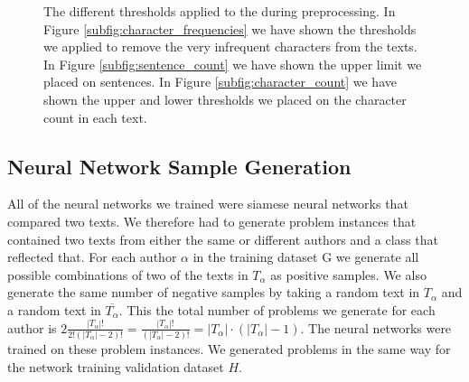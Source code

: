 \begin{figure}[htb]
\begin{minipage}{.5\linewidth}
{        }
    \end{minipage}\par\medskip
    \centering

    \caption{The different thresholds applied to the during preprocessing. In
        Figure \ref{subfig:character_frequencies} we have shown the thresholds
        we applied to remove the very infrequent characters from the texts. In
        Figure \ref{subfig:sentence_count} we have shown the upper limit we
        placed on sentences. In Figure \ref{subfig:character_count} we have
        shown the upper and lower thresholds we placed on the character count in
        each text.
    }
    \label{fig:cutoff_thresholds}
\end{figure}


\subsection{Neural Network Sample Generation} \label{subsec:problem_generation}

All of the neural networks we trained were siamese neural networks that
compared two texts. We therefore had to generate problem instances that
contained two texts from either the same or different authors and a class
that reflected that. For each author $\alpha$ in the training dataset \gls{G}
we generate all possible combinations of two of the texts in $T_\alpha$ as
positive samples. We also generate the same number of negative samples by
taking a random text in $T_\alpha$ and a random text in $\overline{T_\alpha}$.
This the total number of problems we generate for each
author is $2\frac{\left|T_\alpha\right|!}{2!(\left|T_\alpha\right|-2)!}
= \frac{\left|T_\alpha\right|!}{(\left|T_\alpha\right|-2)!} =
\left|T_\alpha\right| \cdot (\left|T_\alpha\right| - 1) $. The neural
networks were trained on these problem instances. We generated problems in the
same way for the network training validation dataset $H$.
